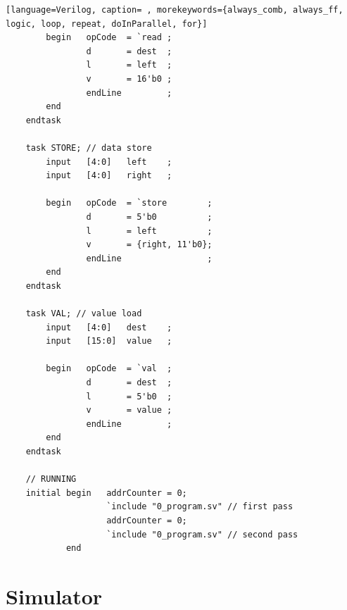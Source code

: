 {\begin{shaded*}
\begin{lstlisting}[language=Verilog, caption= , morekeywords={always_comb, always_ff, logic, loop, repeat, doInParallel, for}]
        begin   opCode  = `read ;
                d       = dest  ;
                l       = left  ;
                v       = 16'b0 ;
                endLine         ;
        end
    endtask

    task STORE; // data store
        input   [4:0]   left    ;
        input   [4:0]   right   ;

        begin   opCode  = `store        ;
                d       = 5'b0          ;
                l       = left          ;
                v       = {right, 11'b0};
                endLine                 ;
        end
    endtask

    task VAL; // value load
        input   [4:0]   dest    ;
        input   [15:0]  value   ;

        begin   opCode  = `val  ;
                d       = dest  ;
                l       = 5'b0  ;
                v       = value ;
                endLine         ;
        end
    endtask

    // RUNNING
    initial begin   addrCounter = 0;
                    `include "0_program.sv" // first pass
                    addrCounter = 0;
                    `include "0_program.sv" // second pass
            end
\end{lstlisting}
\end{shaded*}
}


\section{Simulator}

